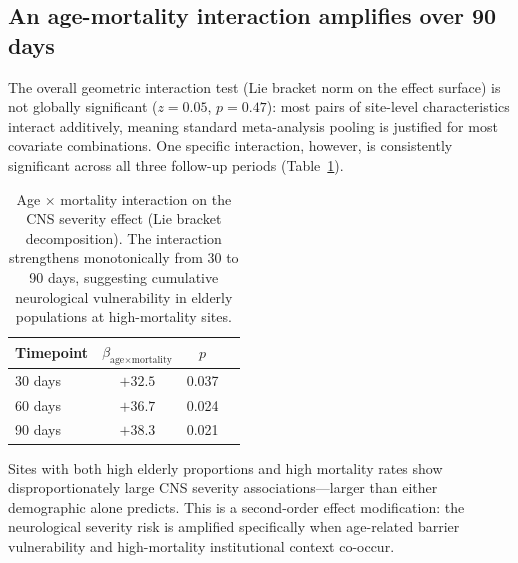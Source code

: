 \documentclass{article}
\begin{document}
\subsection{An age-mortality interaction amplifies over 90 days}

The overall geometric interaction test (Lie bracket norm on the effect surface) is not globally significant ($z = 0.05$, $p = 0.47$): most pairs of site-level characteristics interact additively, meaning standard meta-analysis pooling is justified for most covariate combinations.
One specific interaction, however, is consistently significant across all three follow-up periods (Table~\ref{tab:lie_bracket}).

\begin{table}[t]
\centering
\caption{Age $\times$ mortality interaction on the CNS severity effect (Lie bracket decomposition). The interaction strengthens monotonically from 30 to 90 days, suggesting cumulative neurological vulnerability in elderly populations at high-mortality sites.}
\label{tab:lie_bracket}
\begin{tabular}{lccc}
\toprule
Timepoint & $\beta_{\text{age} \times \text{mortality}}$ & $p$ \\
\midrule
30 days  & $+32.5$ & 0.037 \\
60 days  & $+36.7$ & 0.024 \\
90 days  & $+38.3$ & 0.021 \\
\bottomrule
\end{tabular}
\end{table}

Sites with both high elderly proportions and high mortality rates show disproportionately large CNS severity associations---larger than either demographic alone predicts.
This is a second-order effect modification: the neurological severity risk is amplified specifically when age-related barrier vulnerability and high-mortality institutional context co-occur.
\end{document}
